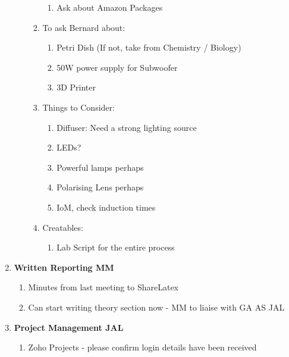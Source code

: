 \begin{enumerate}
\begin{enumerate}
\begin{enumerate}
\begin{enumerate}
\item  Ask about Amazon Packages
\end{enumerate}

\item  To ask Bernard about: 

\begin{enumerate}
\item  Petri Dish (If not, take from Chemistry / Biology)

\item  50W power supply for Subwoofer

\item  3D Printer
\end{enumerate}

\item  Things to Consider: 

\begin{enumerate}
\item  Diffuser: Need a strong lighting source

\item  LEDs?

\item  Powerful lamps perhaps

\item  Polarising Lens perhaps

\item  IoM, check induction times
\end{enumerate}

\item  Creatables: 

\begin{enumerate}
\item  Lab Script for the entire process\\
\end{enumerate}
\end{enumerate}
\end{enumerate}


\noindent 

\item  \textbf{Written Reporting MM}

\begin{enumerate}
\item \textbf{ }Minutes from last meeting to ShareLatex

\item  Can start writing theory section now - MM to liaise with GA AS JAL\\
\end{enumerate}

\item  \textbf{Project Management JAL}

\begin{enumerate}
\item \textbf{ }Zoho Projects - please confirm login details have been received
\end{enumerate}
\end{enumerate}
